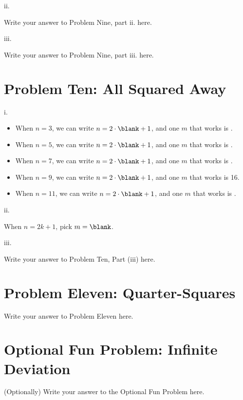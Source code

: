 \documentclass{article}
\renewcommand{\(}{\left(}
\renewcommand{\)}{\right)}
\theoremstyle{plain}
\theoremstyle{plain}
\theoremstyle{definition}
\begin{document}
ii.
\begin{shaded}
Write your answer to Problem Nine, part ii. here.
\end{shaded}

iii.
\begin{shaded}
Write your answer to Problem Nine, part iii. here.
\end{shaded}

\newpage

\section*{Problem Ten: All Squared Away}

i.

\begin{shaded}

\begin{itemize}
\item When $n = 3$, we can write $n = 2 \cdot \blank + 1$, and one $m$ that works is \blank.
\item When $n = 5$, we can write $n = 2 \cdot \blank + 1$, and one $m$ that works is \blank.
\item When $n = 7$, we can write $n = 2 \cdot \blank + 1$, and one $m$ that works is \blank.
\item When $n = 9$, we can write $n = 2 \cdot \blank + 1$, and one $m$ that works is 16.
\item When $n = 11$, we can write $n = 2 \cdot \blank + 1$, and one $m$ that works is \blank.
\end{itemize}

\end{shaded}

ii.
\begin{shaded}

When $n = 2k + 1$, pick $m = \blank$.

\end {shaded}

iii.

\begin{shaded}
Write your answer to Problem Ten, Part (iii) here.
\end{shaded}

\newpage

\section*{Problem Eleven: Quarter-Squares}
\begin{shaded}
Write your answer to Problem Eleven here.
\end{shaded}

\newpage

\section*{Optional Fun Problem: Infinite Deviation}
\begin{shaded}
(Optionally) Write your answer to the Optional Fun Problem here.
\end{shaded}
\end{document}
